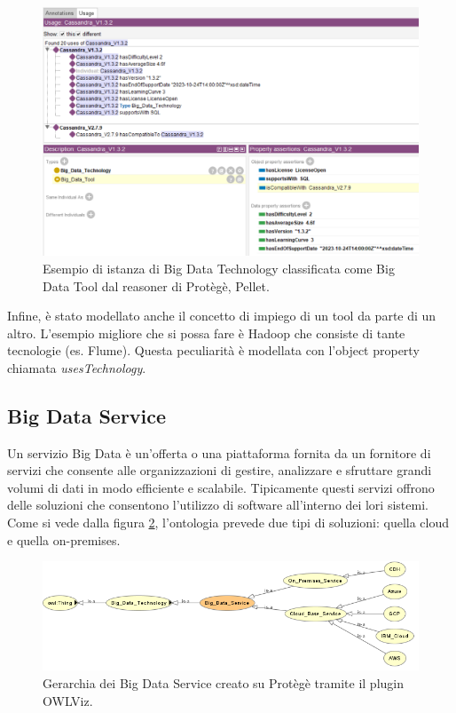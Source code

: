 \begin{figure}[H]
    \centering
    \includegraphics[width=15cm]{docs/images/cassandraex.PNG}
    \caption{Esempio di istanza di Big Data Technology classificata come Big Data Tool dal reasoner di Protègè, Pellet.}
    \label{fig:cassandra_graph}
\end{figure}

Infine, è stato modellato anche il concetto di impiego di un tool da parte di un altro. L'esempio migliore che si possa fare è Hadoop che consiste di tante tecnologie (es. Flume). Questa peculiarità è modellata con l'object property chiamata \textit{usesTechnology}.
\newpage
\subsection{Big Data Service}
Un servizio Big Data è un'offerta o una piattaforma fornita da un fornitore di servizi che consente alle organizzazioni di gestire, analizzare e sfruttare grandi volumi di dati in modo efficiente e scalabile. Tipicamente questi servizi offrono delle soluzioni che consentono l'utilizzo di software all'interno dei lori sistemi. Come si vede dalla figura \ref{fig:bdservice_graph}, l'ontologia prevede due tipi di soluzioni: quella cloud e quella on-premises.

\begin{figure}[H]
    \centering
    \includegraphics[width=12cm]{docs/images/bdserviceowlviz.png}
    \caption{Gerarchia dei Big Data Service creato su Protègè tramite il plugin OWLViz.}
    \label{fig:bdservice_graph}
\end{figure}

